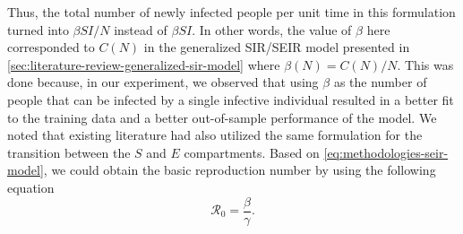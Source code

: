 Thus, the total number of newly infected people per unit time in this formulation turned into $\beta SI / N$ instead of $\beta SI$.
In other words, the value of $\beta$ here corresponded to $C(N)$ in the generalized \gls{SIR}/\gls{SEIR} model presented in \autoref{sec:literature-review-generalized-sir-model} where $\beta(N) = C(N) / N$.
This was done because, in our experiment, we observed that using $\beta$ as the number of people that can be infected by a single infective individual resulted in a better fit to the training data and a better out-of-sample performance of the model.
We noted that existing literature \cite{arikInterpretableSequenceLearning, bastosModelingForecastingEarly2020,dengDynamicsDevelopmentCOVID192020, heSEIRModelingCOVID192020,ihmecovid-19forecastingteamModelingCOVID19Scenarios2021, ndairouMathematicalModelingCOVID192020,sarkarModelingForecastingCOVID192020, zhaoModelingEpidemicDynamics2020} had also utilized the same formulation for the transition between the $S$ and $E$ compartments.
Based on \autoref{eq:methodologies-seir-model}, we could obtain the basic reproduction number by using the following equation
\begin{equation*}
    \mathcal{R}_0 = \frac{\beta}{\gamma}.
    \label{eq:methodologies-seir-reproduction-number}
\end{equation*}

